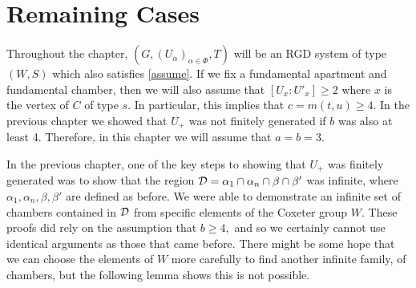 \documentclass[class=book, crop=false]{standalone}
\begin{document}
\chapter{Remaining Cases}
\label{exceptional}
Throughout the chapter, $(G,(U_\alpha)_{\alpha\in \Phi},T)$ will be an RGD system of type $(W,S)$ which also satisfies \eqref{assume}. If we fix a fundamental apartment and fundamental chamber, then we will also assume that $[U_x:U'_x]\ge 2$ where $x$ is the vertex of $C$ of type $s.$ In particular, this implies that $c=m(t,u)\ge 4.$ In the previous chapter we showed that $U_+$ was not finitely generated if $b$ was also at least 4. Therefore, in this chapter we will assume that $a=b=3.$ 

In the previous chapter, one of the key steps to showing that $U_+$ was finitely generated was to show that the region $\mathcal{D}=\alpha_1\cap\alpha_n\cap \beta\cap\beta'$ was infinite, where $\alpha_1,\alpha_n,\beta,\beta'$ are defined as before. We were able to demonstrate an infinite set of chambers contained in $\mathcal{D}$ from specific elements of the Coxeter group $W.$ These proofs did rely on the assumption that $b\ge 4,$ and so we certainly cannot use identical arguments as those that came before. There might be some hope that we can choose the elements of $W$ more carefully to find another infinite family, of chambers, but the following lemma shows this is not possible.
\end{document}
